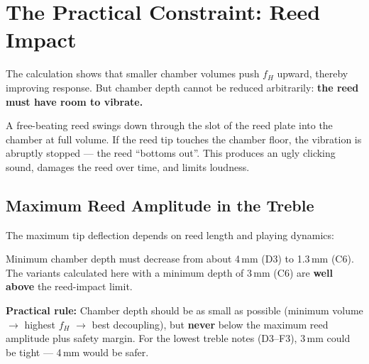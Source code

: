\documentclass[11pt,a4paper]{article}
\begin{document}
\section{The Practical Constraint: Reed Impact}

The calculation shows that smaller chamber volumes push $f_H$ upward, thereby improving response. But chamber depth cannot be reduced arbitrarily: \textbf{the reed must have room to vibrate.}

A free-beating reed swings down through the slot of the reed plate into the chamber at full volume. If the reed tip touches the chamber floor, the vibration is abruptly stopped --- the reed ``bottoms out''. This produces an ugly clicking sound, damages the reed over time, and limits loudness.

\subsection{Maximum Reed Amplitude in the Treble}

The maximum tip deflection depends on reed length and playing dynamics:

\begin{table}[H]
\centering\small
{}
\caption{Estimated reed amplitudes and minimum depths (amplitude $\approx$ 10\,\% of reed length $+$ 0.5\,mm safety margin)}
\end{table}

Minimum chamber depth must decrease from about 4\,mm (D3) to 1.3\,mm (C6). The variants calculated here with a minimum depth of 3\,mm (C6) are \textbf{well above} the reed-impact limit.

\begin{keybox}
\textbf{Practical rule:} Chamber depth should be as small as possible (minimum volume $\to$ highest $f_H$ $\to$ best decoupling), but \textbf{never} below the maximum reed amplitude plus safety margin. For the lowest treble notes (D3--F3), 3\,mm could be tight --- 4\,mm would be safer.
\end{keybox}
\end{document}
